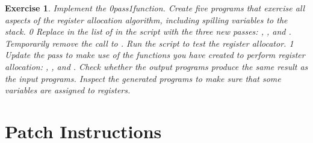 \documentclass[7x10]{TimesAPriori_MIT}%
\def\racketEd{0}
\def\pythonEd{1}
\def\edition{1}
\newcommand{\racket}[1]{{\if\edition\racketEd{#1}\fi}}
\newcommand{\pythonColor}[0]{}
\newcommand{\python}[1]{{\if\edition\pythonEd\pythonColor #1\fi}}
\newtheorem{exercise}[theorem]{Exercise}
\numberwithin{theorem}{chapter}
\numberwithin{definition}{chapter}
\numberwithin{equation}{chapter}
\begin{document}
\begin{exercise}\normalfont\normalsize
Implement the  \racket{pass}\python{function}.
Create five programs that exercise all aspects of the register
allocation algorithm, including spilling variables to the stack.
%
{\if\edition\racketEd      
Replace  in the list of  in the
 script with the three new passes:
, , and
.
Temporarily remove the call to .
Run the script to test the register allocator.
\fi}
%
{\if\edition\pythonEd\pythonColor      
  Update the  pass to make use of
  the functions you have created to perform register allocation:
  , , and
  .
  Check whether the
  output programs produce the same result as the input programs.
  Inspect the generated {\ArchName} programs to make sure that some variables
  are assigned to registers.
\fi}
\end{exercise}


\section{Patch Instructions}
\label{sec:patch-instructions}
\end{document}
